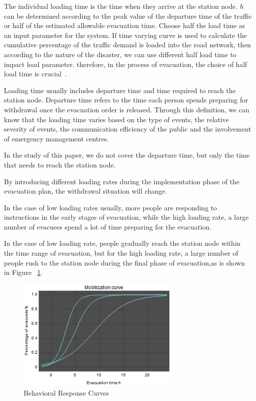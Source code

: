 \documentclass{mcmthesis}
\begin{document}
The individual loading time is the time when they arrive at the station node. $h$ can be determined according to the peak value of the departure time of the traffic or half of the estimated allowable evacuation time. Choose half the load time as an input parameter for the system. If time varying curve is used to calculate the cumulative percentage of the traffic demand is loaded into the road network, then according to the nature of the disaster, we can use different half load time to impact load parameter. therefore, in the process of evacuation, the choice of half load time is crucial~\cite{Sayyady2010Optimizing,So2010Managing}.

Loading time usually includes departure time and time required to reach the station node. Departure time refers to the time each person spends preparing for withdrawal once the evacuation order is released. Through this definition, we can know that the loading time varies based on the type of events, the relative severity of events, the communication efficiency of the public and the involvement of emergency management centres.

In the study of this paper, we do not cover the departure time, but only the time that needs to reach the station node.

By introducing different loading rates during the implementation phase of the evacuation plan, the withdrawal situation will change.

In the case of low loading rates usually, more people are responding to instructions in the early stages of evacuation, while the high loading rate, a large number of evacuees spend a lot of time preparing for the evacuation.

In the case of low loading rate, people gradually reach the station node within the time range of evacuation, but for the high loading rate, a large number of people rush to the station node during the final phase of evacuation,as is shown in Figure ~\ref{fig:2}.

\begin{figure}[htbp]
  \centering
 \caption{Behavioral Response Curves}\label{fig:2}
  \includegraphics[width=0.7\textwidth]{./picture/figure2.png}
 \end{figure}
\end{document}
